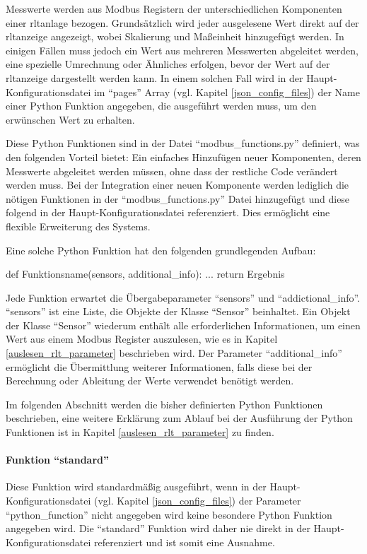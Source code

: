 \label{python_functions}
Messwerte werden aus Modbus Registern der unterschiedlichen Komponenten einer \acs{rltanlage} bezogen.  Grundsätzlich wird jeder ausgelesene Wert direkt auf der \acs{rltanzeige} angezeigt, wobei Skalierung und Maßeinheit hinzugefügt werden. In einigen Fällen muss jedoch ein Wert aus mehreren Messwerten abgeleitet werden, eine spezielle Umrechnung oder Ähnliches erfolgen, bevor der Wert auf der \acs{rltanzeige} dargestellt werden kann. In einem solchen Fall wird in der Haupt-Konfigurationsdatei im \enquote{pages} Array (vgl. Kapitel \ref{json_config_files}) der Name einer Python Funktion angegeben, die ausgeführt werden muss, um den erwünschen Wert zu erhalten. 

Diese Python Funktionen sind in der Datei \enquote{modbus\_functions.py} definiert, was den folgenden Vorteil bietet: Ein einfaches Hinzufügen neuer Komponenten, deren Messwerte abgeleitet werden müssen, ohne dass der restliche Code verändert werden muss. Bei der Integration einer neuen Komponente werden lediglich die nötigen Funktionen in der \enquote{modbus\_functions.py} Datei hinzugefügt und diese folgend in der Haupt-Konfigurationsdatei referenziert. Dies ermöglicht eine flexible  Erweiterung des Systems.

Eine solche Python Funktion hat den folgenden grundlegenden Aufbau:
\begin{pythoncode}
def Funktionsname(sensors, additional_info):
	...	
	return Ergebnis
\end{pythoncode}

Jede Funktion erwartet die Übergabeparameter \enquote{sensors} und \enquote{addictional\_info}. \enquote{sensors} ist eine Liste, die Objekte der Klasse \enquote{Sensor} beinhaltet. Ein Objekt der Klasse \enquote{Sensor} wiederum enthält alle erforderlichen Informationen, um einen Wert aus einem Modbus Register auszulesen, wie es in Kapitel \ref{auslesen_rlt_parameter} beschrieben wird. \newline 
Der Parameter \enquote{additional\_info} ermöglicht die Übermittlung weiterer Informationen, falls diese bei der Berechnung oder Ableitung der Werte verwendet benötigt werden.

Im folgenden Abschnitt werden die bisher definierten Python Funktionen beschrieben, eine weitere Erklärung zum Ablauf bei der Ausführung der Python Funktionen ist in Kapitel \ref{auslesen_rlt_parameter} zu finden.


\paragraph{Funktion \enquote{standard}}
Diese Funktion wird standardmäßig ausgeführt, wenn in der Haupt-Konfigurationsdatei (vgl. Kapitel \ref{json_config_files}) der Parameter \enquote{python\_function} nicht angegeben wird \bzw keine besondere Python Funktion angegeben wird. Die \enquote{standard} Funktion wird daher nie direkt in der Haupt-Konfigurationsdatei referenziert und ist somit eine Ausnahme.

